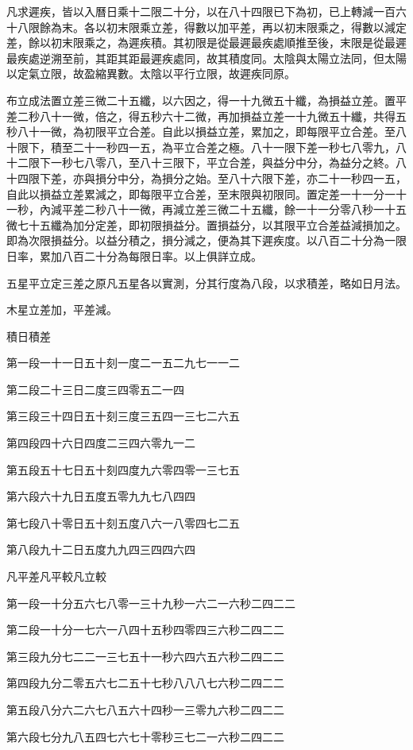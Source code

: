 凡求遲疾，皆以入曆日乘十二限二十分，以在八十四限已下為初，已上轉減一百六十八限餘為末。各以初末限乘立差，得數以加平差，再以初末限乘之，得數以減定差，餘以初末限乘之，為遲疾積。其初限是從最遲最疾處順推至後，末限是從最遲最疾處逆溯至前，其距其距最遲疾處同，故其積度同。太陰與太陽立法同，但太陽以定氣立限，故盈縮異數。太陰以平行立限，故遲疾同原。

布立成法置立差三微二十五纖，以六因之，得一十九微五十纖，為損益立差。置平差二秒八十一微，倍之，得五秒六十二微，再加損益立差一十九微五十纖，共得五秒八十一微，為初限平立合差。自此以損益立差，累加之，即每限平立合差。至八十限下，積至二十一秒四一五，為平立合差之極。八十一限下差一秒七八零九，八十二限下一秒七八零八，至八十三限下，平立合差，與益分中分，為益分之終。八十四限下差，亦與損分中分，為損分之始。至八十六限下差，亦二十一秒四一五，自此以損益立差累減之，即每限平立合差，至末限與初限同。置定差一十一分一十一秒，內減平差二秒八十一微，再減立差三微二十五纖，餘一十一分零八秒一十五微七十五纖為加分定差，即初限損益分。置損益分，以其限平立合差益減損加之。即為次限損益分。以益分積之，損分減之，便為其下遲疾度。以八百二十分為一限日率，累加八百二十分為每限日率。以上俱詳立成。

五星平立定三差之原凡五星各以實測，分其行度為八段，以求積差，略如日月法。

木星立差加，平差減。

積日積差

第一段一十一日五十刻一度二一五二九七一一二

第二段二十三日二度三四零五二一四

第三段三十四日五十刻三度三五四一三七二六五

第四段四十六日四度二三四六零九一二

第五段五十七日五十刻四度九六零四零一三七五

第六段六十九日五度五零九九七八四四

第七段八十零日五十刻五度八六一八零四七二五

第八段九十二日五度九九四三四四六四

凡平差凡平較凡立較

第一段一十分五六七八零一三十九秒一六二一六秒二四二二

第二段一十分一七六一八四十五秒四零四三六秒二四二二

第三段九分七二二一三七五十一秒六四六五六秒二四二二

第四段九分二零五六七二五十七秒八八八七六秒二四二二

第五段八分六二六七八五六十四秒一三零九六秒二四二二

第六段七分九八五四七六七十零秒三七二一六秒二四二二

